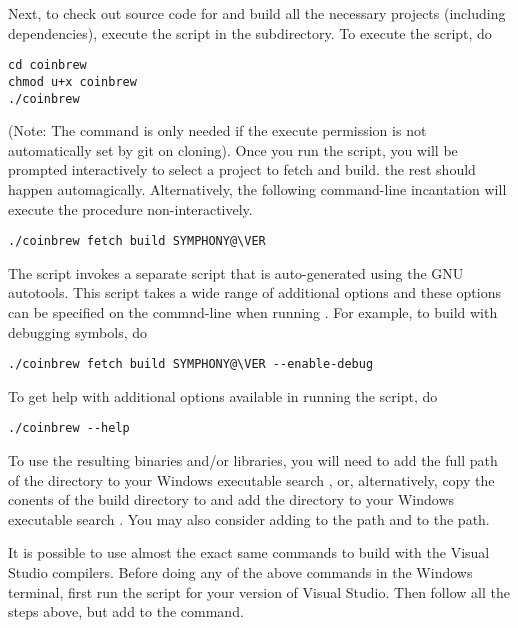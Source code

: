 Next, to check out source code for and build all the necessary projects
(including dependencies), execute the script in the 
subdirectory. To execute the script, do

{\color{brown}
\begin{verbatim}
cd coinbrew
chmod u+x coinbrew
./coinbrew
\end{verbatim}
}

(Note: The  command is only needed if the execute permission is not
automatically set by git on cloning). Once you run the script,
you will be prompted interactively to select a project to fetch and build. the
rest should happen automagically. Alternatively, the following command-line
incantation will execute the procedure non-interactively.

{\color{brown}
\begin{verbatim}
./coinbrew fetch build SYMPHONY@\VER
\end{verbatim}
}
The  script invokes a separate  script that is
auto-generated using the GNU autotools. This script takes a wide range of
additional options and these options can be specified on the commnd-line when
running . For example, to build with debugging symbols,
do

{\color{brown}
\begin{verbatim}
./coinbrew fetch build SYMPHONY@\VER --enable-debug
\end{verbatim}
}

To get help with additional options available in running the script, do

{\color{brown}
\begin{verbatim}
./coinbrew --help
\end{verbatim}
}

To use the resulting binaries and/or libraries, you will need to add the
full path of the directory  to your Windows executable
search , or, alternatively, copy the conents of the build directory to 
 and add the directory  
to your Windows executable search . You may also consider adding
 to the  path and 
 to the  path. 

It is possible to use almost the exact same commands to build with the Visual
Studio compilers. Before doing any of the above commands in the Windows
terminal, first run the  script for your version of Visual
Studio. Then follow all the steps above, but add  to the
 command.

